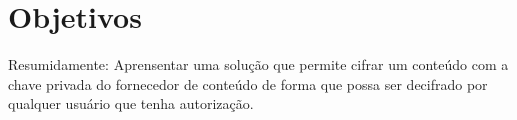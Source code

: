 \section{Objetivos}

Resumidamente: Aprensentar uma solução que permite cifrar um conteúdo com a chave privada do fornecedor de conteúdo de forma que possa ser decifrado por qualquer usuário que tenha autorização.